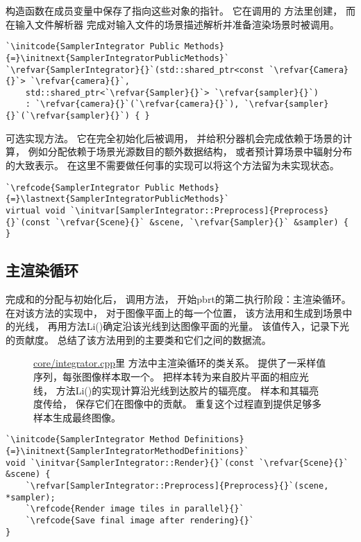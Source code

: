 构造函数在成员变量中保存了指向这些对象的指针。
它在调用的
方法里创建，
而在输入文件解析器
完成对输入文件的场景描述解析并准备渲染场景时被调用。
\begin{lstlisting}
`\initcode{SamplerIntegrator Public Methods}{=}\initnext{SamplerIntegratorPublicMethods}`
`\refvar{SamplerIntegrator}{}`(std::shared_ptr<const `\refvar{Camera}{}`> `\refvar{camera}{}`,
    std::shared_ptr<`\refvar{Sampler}{}`> `\refvar{sampler}{}`)
    : `\refvar{camera}{}`(`\refvar{camera}{}`), `\refvar{sampler}{}`(`\refvar{sampler}{}`) { }
\end{lstlisting}

可选实现方法。
它在完全初始化后被调用，
并给积分器机会完成依赖于场景的计算，
例如分配依赖于场景光源数目的额外数据结构，
或者预计算场景中辐射分布的大致表示。
在这里不需要做任何事的实现可以将这个方法留为未实现状态。
\begin{lstlisting}
`\refcode{SamplerIntegrator Public Methods}{=}\lastnext{SamplerIntegratorPublicMethods}`
virtual void `\initvar[SamplerIntegrator::Preprocess]{Preprocess}{}`(const `\refvar{Scene}{}` &scene, `\refvar{Sampler}{}` &sampler) { }
\end{lstlisting}

\subsection{主渲染循环}\label{sub:主渲染循环}
完成和的分配与初始化后，
调用方法，
开始pbrt的第二执行阶段：主渲染循环。
在对该方法的实现中，
对于图像平面上的每一个位置，
该方法用和生成到场景中的光线，
再用方法{\ttfamily Li()}确定沿该光线到达图像平面的光量。
该值传入，记录下光的贡献度。
总结了该方法用到的主要类和它们之间的数据流。
\begin{figure}[htbp]
    \centering
    \caption{\protect\href{https://github.com/mmp/pbrt-v3/tree/master/src/core/integrator.cpp}{\ttfamily core/integrator.cpp}里
    方法\protect{}中主渲染循环的类关系。
    \protect{}提供了一采样值序列，每张图像样本取一个。
    \protect{}把样本转为来自胶片平面的相应光线，
    方法{\ttfamily Li()}的实现计算沿光线到达胶片的辐亮度。
    样本和其辐亮度传给\protect{}，
    保存它们在图像中的贡献。
    重复这个过程直到\protect{}提供足够多样本生成最终图像。}
    \label{fig:1.17}
\end{figure}
\begin{lstlisting}
`\initcode{SamplerIntegrator Method Definitions}{=}\initnext{SamplerIntegratorMethodDefinitions}`
void `\initvar{SamplerIntegrator::Render}{}`(const `\refvar{Scene}{}` &scene) {
    `\refvar[SamplerIntegrator::Preprocess]{Preprocess}{}`(scene, *sampler);
    `\refcode{Render image tiles in parallel}{}`
    `\refcode{Save final image after rendering}{}`
}
\end{lstlisting}

